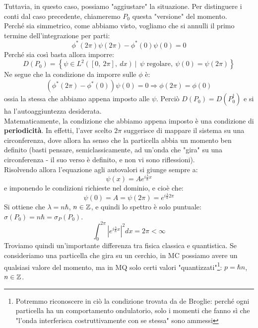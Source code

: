 \documentclass[../../FisicaTeorica.tex]{subfiles}
\begin{document}
Tuttavia, in questo caso, possiamo "aggiustare" la situazione. Per distinguere i conti dal caso precedente, chiameremo $P_0$ questa "versione" del momento.\\
Perché sia simmetrico, come abbiamo visto, vogliamo che si annulli il primo termine dell'integrazione per parti:
\[
\phi^\ast\left(2\pi\right)\psi\left(2\pi\right)-\phi^\ast\left(0\right)\psi \left(0\right)=0
\]
Perché sia così basta allora imporre:
\[
D\left(P_0\right)=\left\{\psi\in L^2\left(\left[0,\ 2\pi\right],\ dx\right)\ |\ \ \psi\text{ regolare},\ \psi\left(0\right)=\psi(2\pi)\right\}
\]
Ne segue che la condizione da imporre sulle $\phi$ è:
\[
\left(\phi^\ast\left(2\pi\right)-\phi^\ast\left(0\right)\right)\psi \left(0\right)=0\Rightarrow \phi \left(2\pi\right)=\phi \left(0\right)
\]
ossia la stessa che abbiamo appena imposto alle $\psi$. Perciò $D\left(P_0\right)=D\left(P_0^\dag\right)$ e si ha l'autoaggiuntezza desiderata.\\
Matematicamente, la condizione che abbiamo appena imposto è una condizione di \textbf{periodicità}. In effetti, l'aver scelto $2\pi$  suggerisce di mappare il sistema su una circonferenza, dove allora ha senso che la particella abbia un momento ben definito (basti pensare, semiclassicamente, ad un'onda che "gira" su una circonferenza - il suo verso è definito, e non vi sono riflessioni).\\
Risolvendo allora l'equazione agli autovalori si giunge sempre a:
\[
\psi\left(x\right)=A e^{i\frac{\lambda}{\hbar}x}
\]
e imponendo le condizioni richieste nel dominio, e cioè che:
\[
\psi\left(0\right)=A= \psi \left(2\pi\right)=e^{i\frac{\lambda}{\hbar}2\pi}
\]
Si ottiene che $\lambda = n\hbar$, $n\in \mathbb{Z}$, e quindi lo spettro è solo puntuale: $\sigma(P_0) = n\hbar = \sigma_P(P_0)$.
\[
\int_{0}^{2\pi}{\left|e^{i\frac{\lambda}{\hbar}x}\right|^2dx=2\pi<\infty}
\]
Troviamo quindi un'importante differenza tra fisica classica e quantistica. Se consideriamo una particella che gira su un cerchio, in MC possiamo avere un qualsiasi valore del momento, ma in MQ solo certi valori "quantizzati"\footnote{Potremmo riconoscere in ciò la condizione trovata da de Broglie: perché ogni particella ha un comportamento ondulatorio, solo i momenti che fanno sì che "l'onda interferisca costruttivamente con se stessa" sono ammessi}: $p=\hbar n$, $n\in \mathbb{Z}$.\\
\end{document}
